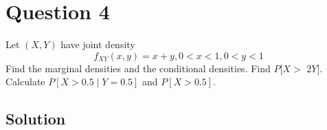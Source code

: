 \section*{Question 4}

Let \( (X, Y) \) have joint density
\begin{equation*}
    f_{X Y}(x, y)=x+y, 0<x<1,0<y<1
\end{equation*}
Find the marginal densities and the conditional densities. Find \( P[X> \) \( 2 Y] \).
Calculate \( P[X>0.5 \mid Y=0.5] \) and \( P[X>0.5] \).

\subsection*{Solution}
